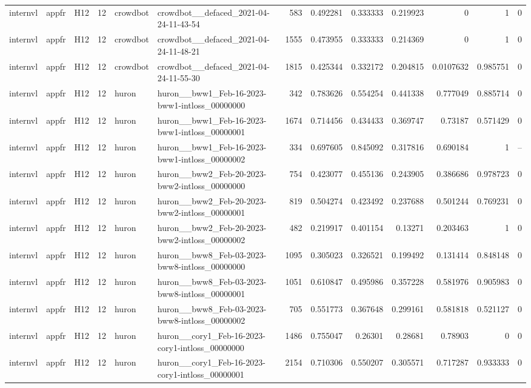 \begin{longtable}{lllrllrrrrrrr}
internvl & appfr & H12 & 12 & crowdbot & crowdbot\_\_defaced\_2021-04-24-11-43-54 & 583 & 0.492281 & 0.333333 & 0.219923 & 0 & 1 & 0 \\
internvl & appfr & H12 & 12 & crowdbot & crowdbot\_\_defaced\_2021-04-24-11-48-21 & 1555 & 0.473955 & 0.333333 & 0.214369 & 0 & 1 & 0 \\
internvl & appfr & H12 & 12 & crowdbot & crowdbot\_\_defaced\_2021-04-24-11-55-30 & 1815 & 0.425344 & 0.332172 & 0.204815 & 0.0107632 & 0.985751 & 0 \\
internvl & appfr & H12 & 12 & huron & huron\_\_bww1\_Feb-16-2023-bww1-intloss\_00000000 & 342 & 0.783626 & 0.554254 & 0.441338 & 0.777049 & 0.885714 & 0 \\
internvl & appfr & H12 & 12 & huron & huron\_\_bww1\_Feb-16-2023-bww1-intloss\_00000001 & 1674 & 0.714456 & 0.434433 & 0.369747 & 0.73187 & 0.571429 & 0 \\
internvl & appfr & H12 & 12 & huron & huron\_\_bww1\_Feb-16-2023-bww1-intloss\_00000002 & 334 & 0.697605 & 0.845092 & 0.317816 & 0.690184 & 1 & -- \\
internvl & appfr & H12 & 12 & huron & huron\_\_bww2\_Feb-20-2023-bww2-intloss\_00000000 & 754 & 0.423077 & 0.455136 & 0.243905 & 0.386686 & 0.978723 & 0 \\
internvl & appfr & H12 & 12 & huron & huron\_\_bww2\_Feb-20-2023-bww2-intloss\_00000001 & 819 & 0.504274 & 0.423492 & 0.237688 & 0.501244 & 0.769231 & 0 \\
internvl & appfr & H12 & 12 & huron & huron\_\_bww2\_Feb-20-2023-bww2-intloss\_00000002 & 482 & 0.219917 & 0.401154 & 0.13271 & 0.203463 & 1 & 0 \\
internvl & appfr & H12 & 12 & huron & huron\_\_bww8\_Feb-03-2023-bww8-intloss\_00000000 & 1095 & 0.305023 & 0.326521 & 0.199492 & 0.131414 & 0.848148 & 0 \\
internvl & appfr & H12 & 12 & huron & huron\_\_bww8\_Feb-03-2023-bww8-intloss\_00000001 & 1051 & 0.610847 & 0.495986 & 0.357228 & 0.581976 & 0.905983 & 0 \\
internvl & appfr & H12 & 12 & huron & huron\_\_bww8\_Feb-03-2023-bww8-intloss\_00000002 & 705 & 0.551773 & 0.367648 & 0.299161 & 0.581818 & 0.521127 & 0 \\
internvl & appfr & H12 & 12 & huron & huron\_\_cory1\_Feb-16-2023-cory1-intloss\_00000000 & 1486 & 0.755047 & 0.26301 & 0.28681 & 0.78903 & 0 & 0 \\
internvl & appfr & H12 & 12 & huron & huron\_\_cory1\_Feb-16-2023-cory1-intloss\_00000001 & 2154 & 0.710306 & 0.550207 & 0.305571 & 0.717287 & 0.933333 & 0 \\

\end{longtable}
